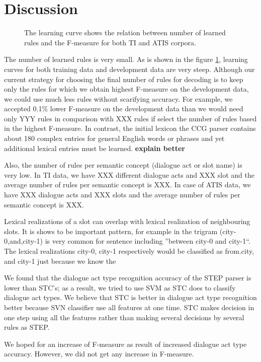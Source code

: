 \documentclass[11pt]{article}
\newcommand{\efgr}[2]{
  \begin{figure}[htbp]
    \makebox[8.5cm]{\framebox[5cm]{\rule{0pt}{5cm}}}
    \caption{#2}
    \label{#1}
  \end{figure}
}
\begin{document}
\section{Discussion}

\efgr{fig:learning:curve}{The learning curve shows the relation between number of learned rules and the F-measure for both TI and ATIS corpora.}

The number of learned rules is very small. As is shown in the figure \ref{fig:learning:curve}, learning curves for both training data and development data are very steep. Although our current strategy for choosing the final number of rules for decoding is to keep only the rules for which we obtain highest F-measure on the development data, we could use much less rules without scarifying accuracy. For example, we accepted 0.1\% lower F-measure on the development data than we would need only YYY rules in comparison with XXX rules if select the number of rules based in the highest F-measure. In contrast, the initial lexicon the CCG parser \cite{zettlemoyer07} contains about 180 complex entries for general English words or phrases and yet additional lexical entries must be learned. \textbf{explain better}

Also, the number of rules per semantic concept (dialogue act or slot name) is very low. In TI data, we have XXX different dialogue acts and XXX slot and the average number of rules per semantic concept is XXX. In case of ATIS data, we have XXX dialogue acts and XXX slots and the average number of rules per semantic concept is XXX.

Lexical realizations of a slot can overlap with lexical realization of neighbouring slots. It is shows to be important pattern, for example in the trigram (city-0,and,city-1) is very common for sentence including ''between city-0 and city-1``. The lexical realizations city-0, city-1 respectively would be classified as from.city, and city-1 just because we know the  


We found that the dialogue act type recognition accuracy of the STEP parser is lower than STC's; as a result, we tried to use SVM as STC does to classify dialogue act types. We believe that STC is better in dialogue act type recognition better because SVN classifier use all features at one time. STC makes decision in one step using all the features rather than making several decisions by several rules as STEP.

We hoped for an increase of F-measure as result of increased dialogue act type accuracy. However, we did not get any increase in F-measure.
\end{document}
